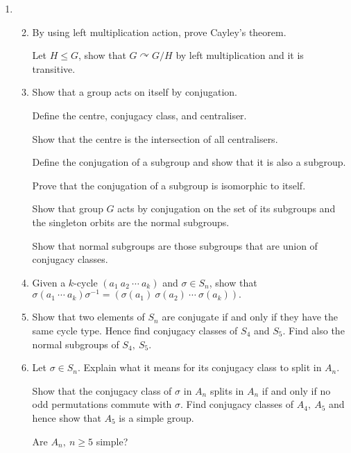 \documentclass[11pt]{article}
\newlength{\qspace}
\newcounter{qnumber}
\newenvironment{question}%
 {\vspace{\qspace}
  \begin{enumerate}[\bfseries 1\quad][10]%
    \setcounter{enumi}{\value{qnumber}}%
    \item%
 }
{
  \end{enumerate}
  \filbreak
  \stepcounter{qnumber}
 }
\newenvironment{questionparts}[1][1]%
 {
  \begin{enumerate}[\bfseries (i)]%
    \setcounter{enumii}{#1}
    \addtocounter{enumii}{-1}
    \setlength{\parskip}{3pt}
 }
 {
  \end{enumerate}
 }
\def\le{\leqslant}
\def\ge{\geqslant}
\begin{document}
\begin{question}
  \begin{questionparts}
    \item By using left multiplication action, prove Cayley's theorem. 
    
    Let $H\le G$, show that $G \curvearrowright G/H$ by left multiplication and it is transitive.
    \item Show that a group acts on itself by conjugation. 
    
    Define the centre, conjugacy class, and centraliser. 
    
    Show that the centre is the intersection of all centralisers.
    
    Define the conjugation of a subgroup and show that it is also a subgroup. 
    
    Prove that the conjugation of a subgroup is isomorphic to itself. 
    
    Show that group $G$ acts by conjugation on the set of its subgroups and the singleton orbits are the normal subgroups. 
    
    Show that normal subgroups are those subgroups that are union of conjugacy classes.
    \item Given a $k$-cycle $(a_1\ a_2\ \cdots\ a_k)$ and $ \sigma\in S_n $, show that $ \sigma(a_1\ \cdots \ a_k)\sigma^{-1}=(\sigma(a_1)\ \sigma(a_2)\ \cdots\ \sigma(a_k)). $
    \item Show that two elements of $S_n$ are conjugate if and only if they have the same cycle type. Hence find conjugacy classes of $S_4$ and $ S_5 $. Find also the normal subgroups of $ S_4,\ S_5 $.
    \item Let $ \sigma\in S_n $. Explain what it means for its conjugacy class to split in $A_n$. 
    
    Show that the conjugacy class of $ \sigma $ in $A_n$ splits in $A_n$ if and only if no odd permutations commute with $\sigma$. Find conjugacy classes of $ A_4,\ A_5 $ and hence show that $A_5$ is a simple group. 

    Are $ A_n,\ n\ge 5 $ simple?
  \end{questionparts}
\end{question}
\end{document}
